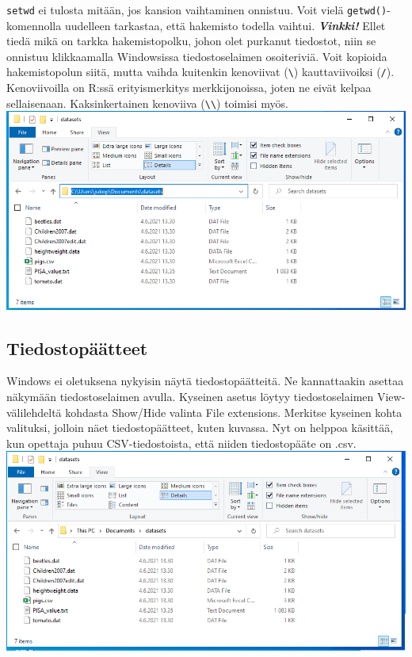 \documentclass[
]{book}
\begin{document}
\texttt{setwd} ei tulosta mitään, jos kansion vaihtaminen onnistuu. Voit vielä \texttt{getwd()}-komennolla uudelleen tarkastaa, että hakemisto todella vaihtui.
\textbf{\emph{Vinkki!}} Ellet tiedä mikä on tarkka hakemistopolku, johon olet purkanut tiedostot, niin se onnistuu klikkaamalla Windowsissa tiedostoselaimen osoiteriviä. Voit kopioida hakemistopolun siitä, mutta vaihda kuitenkin kenoviivat (\texttt{\textbackslash{}}) kauttaviivoiksi (\texttt{/}). Kenoviivoilla on R:ssä erityismerkitys merkkijonoissa, joten ne eivät kelpaa sellaisenaan. Kaksinkertainen kenoviiva (\texttt{\textbackslash{}\textbackslash{}}) toimisi myös.
\includegraphics{files/03-reading_data/windows_show_file_path2.png}

\hypertarget{tiedostopuxe4uxe4tteet}{%
\subsection{Tiedostopäätteet}\label{tiedostopuxe4uxe4tteet}}

Windows ei oletuksena nykyisin näytä tiedostopäätteitä. Ne kannattaakin asettaa näkymään tiedostoselaimen avulla. Kyseinen asetus löytyy tiedostoselaimen View-välilehdeltä kohdasta Show/Hide valinta File extensions. Merkitse kyseinen kohta valituksi, jolloin näet tiedostopäätteet, kuten kuvassa. Nyt on helppoa käsittää, kun opettaja puhuu CSV-tiedostoista, että niiden tiedostopääte on .csv.
\includegraphics{files/03-reading_data/windows_show_file_extensions2.png}
\end{document}
